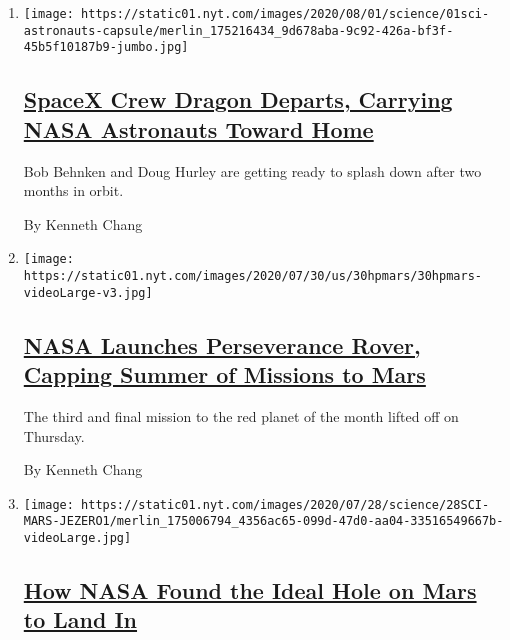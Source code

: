 \begin{enumerate}
\def\labelenumi{\arabic{enumi}.}
\item
  \texttt{[image: https://static01.nyt.com/images/2020/08/01/science/01sci-astronauts-capsule/merlin\_175216434\_9d678aba-9c92-426a-bf3f-45b5f10187b9-jumbo.jpg]}

  \hypertarget{spacex-crew-dragon-departs-carrying-nasa-astronauts-toward-home}{%
  \subsection{\texorpdfstring{\href{/2020/08/01/science/nasa-spacex-astronauts.html}{SpaceX
  Crew Dragon Departs, Carrying NASA Astronauts Toward
  Home}}{SpaceX Crew Dragon Departs, Carrying NASA Astronauts Toward Home}}\label{spacex-crew-dragon-departs-carrying-nasa-astronauts-toward-home}}

  Bob Behnken and Doug Hurley are getting ready to splash down after two
  months in orbit.

  By Kenneth Chang
\item
  \texttt{[image: https://static01.nyt.com/images/2020/07/30/us/30hpmars/30hpmars-videoLarge-v3.jpg]}

  \hypertarget{nasa-launches-perseverance-rover-capping-summer-of-missions-to-mars}{%
  \subsection{\texorpdfstring{\href{/2020/07/30/science/nasa-mars-launch.html}{NASA
  Launches Perseverance Rover, Capping Summer of Missions to
  Mars}}{NASA Launches Perseverance Rover, Capping Summer of Missions to Mars}}\label{nasa-launches-perseverance-rover-capping-summer-of-missions-to-mars}}

  The third and final mission to the red planet of the month lifted off
  on Thursday.

  By Kenneth Chang
\item
  \texttt{[image: https://static01.nyt.com/images/2020/07/28/science/28SCI-MARS-JEZERO1/merlin\_175006794\_4356ac65-099d-47d0-aa04-33516549667b-videoLarge.jpg]}

  \hypertarget{how-nasa-found-the-ideal-hole-on-mars-to-land-in}{%
  \subsection{\texorpdfstring{\href{/2020/07/28/science/nasa-jezero-perseverance.html}{How
  NASA Found the Ideal Hole on Mars to Land
  In}}{How NASA Found the Ideal Hole on Mars to Land In}}\label{how-nasa-found-the-ideal-hole-on-mars-to-land-in}}


\end{enumerate}
